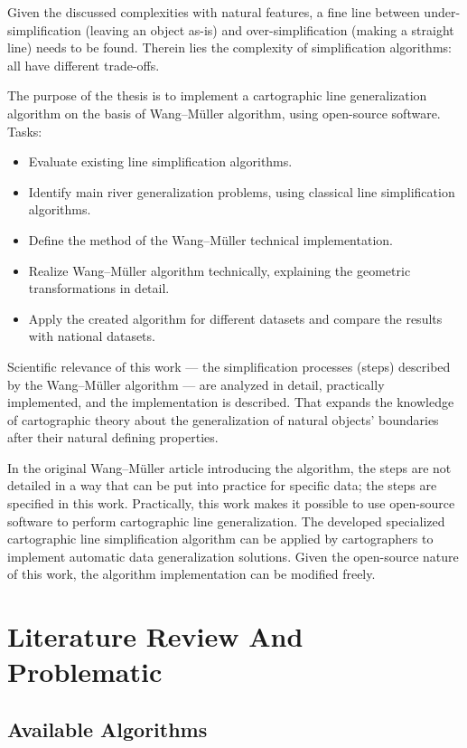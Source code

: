 \documentclass[a4paper]{article}
\newcommand{\WM}{Wang--M{\"u}ller}
\begin{document}
Given the discussed complexities with natural features, a fine line between
under-simplification (leaving an object as-is) and over-simplification (making a
straight line) needs to be found. Therein lies the complexity of simplification
algorithms: all have different trade-offs.

The purpose of the thesis is to implement a cartographic line generalization
algorithm on the basis of {\WM} algorithm, using open-source software. Tasks:

\begin{itemize}
    \item Evaluate existing line simplification algorithms.
    \item Identify main river generalization problems, using classical line
        simplification algorithms.
    \item Define the method of the {\WM} technical implementation.
    \item Realize {\WM} algorithm technically, explaining the geometric
        transformations in detail.
    \item Apply the created algorithm for different datasets and compare
        the results with national datasets.
\end{itemize}

Scientific relevance of this work --- the simplification processes (steps)
described by the {\WM} algorithm --- are analyzed in detail, practically
implemented, and the implementation is described. That expands the knowledge of
cartographic theory about the generalization of natural objects' boundaries
after their natural defining properties.

In the original {\WM} article introducing the algorithm, the steps are not
detailed in a way that can be put into practice for specific data; the steps are
specified in this work. Practically, this work makes it possible to use open-source software to perform cartographic line generalization. The developed
specialized cartographic line simplification algorithm can be applied by
cartographers to implement automatic data generalization solutions. Given the
open-source nature of this work, the algorithm implementation can be modified
freely.

\section{Literature Review And Problematic}
\label{sec:literature-review-problematic}

\subsection{Available Algorithms}
\end{document}

